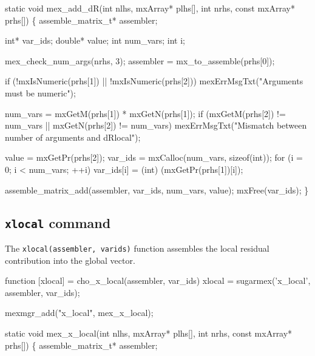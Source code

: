 \nwenddocs{}\plusendmoddef
static void mex_add_dR(int nlhs, mxArray* plhs[],
                       int nrhs, const mxArray* prhs[])
\{
    assemble_matrix_t* assembler;

    int*    var_ids;
    double* value;
    int     num_vars;
    int     i;

    mex_check_num_args(nrhs, 3);
    assembler = mx_to_assemble(prhs[0]);

    if (!mxIsNumeric(prhs[1]) || !mxIsNumeric(prhs[2]))
        mexErrMsgTxt("Arguments must be numeric");

    num_vars  = mxGetM(prhs[1]) * mxGetN(prhs[1]);
    if (mxGetM(prhs[2]) != num_vars || mxGetN(prhs[2]) != num_vars)
        mexErrMsgTxt("Mismatch between number of arguments and dRlocal");

    value     = mxGetPr(prhs[2]);
    var_ids   = mxCalloc(num_vars, sizeof(int));
    for (i = 0; i < num_vars; ++i)
        var_ids[i] = (int) (mxGetPr(prhs[1])[i]);

    assemble_matrix_add(assembler, var_ids, num_vars, value);
    mxFree(var_ids);
\}

\nwendcode{}\nwdocspar


\subsection{{\tt{}x{}local} command}

The {\tt{}x{}local(assembler,\ var{}ids)} function assembles the local
residual contribution into the global vector.

\nwenddocs{}\endmoddef
function [xlocal] = cho_x_local(assembler, var_ids)
xlocal = sugarmex('x_local', assembler, var_ids);
\nwendcode{}\nwdocspar

\nwenddocs{}\plusendmoddef
mexmgr_add("x_local", mex_x_local);
\nwendcode{}\nwdocspar

\nwenddocs{}\plusendmoddef
static void mex_x_local(int nlhs, mxArray* plhs[],
                        int nrhs, const mxArray* prhs[])
\{
    assemble_matrix_t* assembler;

